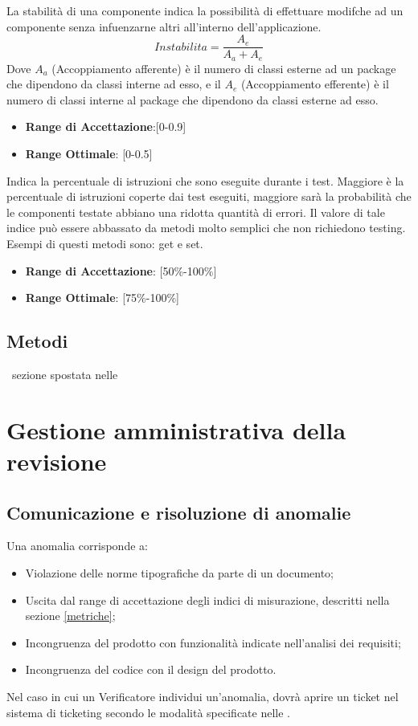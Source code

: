 \documentclass[12pt,a4paper]{article}
\begin{document}
La stabilità di una componente indica la possibilità di effettuare modifche ad un componente senza infuenzarne altri all’interno dell'applicazione.
\[Instabilita=\frac{A_e}{A_a+A_e}\]
Dove $A_a$ (Accoppiamento afferente) è il numero di classi esterne ad un package che dipendono da classi interne ad esso, e il $A_e$ (Accoppiamento efferente) è il numero di classi interne al package che dipendono da classi esterne ad esso.
\begin{itemize}
\item \textbf{Range di Accettazione}:[0-0.9]
\item \textbf{Range Ottimale}: [0-0.5]
\end{itemize}
Indica la percentuale di istruzioni che sono eseguite durante i test. Maggiore è la percentuale di istruzioni coperte dai test eseguiti, maggiore sarà la probabilità che le componenti testate abbiano una ridotta quantità di errori. Il valore di tale indice può essere abbassato da metodi molto semplici che non richiedono testing. Esempi di questi metodi sono: get e set.
\begin{itemize}
\item \textbf{Range di Accettazione}: [50\%-100\%]
\item \textbf{Range Ottimale}: [75\%-100\%]
\end{itemize}
\subsection{Metodi}
\TODO \AVI\ sezione spostata nelle \NdP
\newpage
\section{Gestione amministrativa della revisione}
\subsection{Comunicazione e risoluzione di anomalie}
Una anomalia corrisponde a:
\begin{itemize}
\item Violazione delle norme tipografiche da parte di un documento;
\item Uscita dal range di accettazione degli indici di misurazione, descritti nella sezione \ref{metriche};
\item Incongruenza del prodotto con funzionalità indicate nell’analisi dei requisiti;
\item Incongruenza del codice con il design del prodotto.
\end{itemize}
Nel caso in cui un Verificatore individui un’anomalia, dovrà aprire un ticket nel sistema di ticketing secondo le modalità specificate nelle \NdP.
\end{document}
